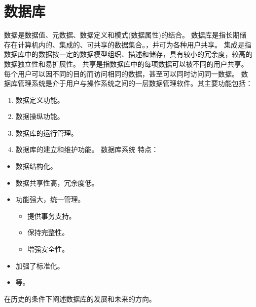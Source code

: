 \documentclass[letterpaper,10pt,english]{sphinxmanual}
\begin{document}
\chapter{数据库}
\label{\detokenize{files/Chap1:id1}}\label{\detokenize{files/Chap1::doc}}
\sphinxAtStartPar
数据是数据值、元数据、数据定义和模式(数据属性)的结合。
数据库是指长期储存在计算机内的、集成的、可共享的数据集合。，并可为各种用户共享。
集成是指数据库中的数据按一定的数据模型组织、描述和储存，具有较小的冗余度，较高的数据独立性和易扩展性。
共享是指数据库中的每项数据可以被不同的用户共享。每个用户可以因不同的目的而访问相同的数据，甚至可以同时访问同一数据。
数据库管理系统是介于用户与操作系统之间的一层数据管理软件。其主要功能包括：
\begin{enumerate}
%
\item {} 
\sphinxAtStartPar
数据定义功能。

\item {} 
\sphinxAtStartPar
数据操纵功能。

\item {} 
\sphinxAtStartPar
数据库的运行管理。

\item {} 
\sphinxAtStartPar
数据库的建立和维护功能。
数据库系统 特点：

\end{enumerate}
\begin{itemize}
\item {} 
\sphinxAtStartPar
数据结构化。

\item {} 
\sphinxAtStartPar
数据共享性高，冗余度低。

\item {} 
\sphinxAtStartPar
功能强大，统一管理。
\begin{itemize}
\item {} 
\sphinxAtStartPar
提供事务支持。

\item {} 
\sphinxAtStartPar
保持完整性。

\item {} 
\sphinxAtStartPar
增强安全性。

\end{itemize}

\item {} 
\sphinxAtStartPar
加强了标准化。

\item {} 
\sphinxAtStartPar
等。

\end{itemize}

\sphinxAtStartPar
在历史的条件下阐述数据库的发展和未来的方向。



\renewcommand{\indexname}{索引}
\printindex
\end{document}
